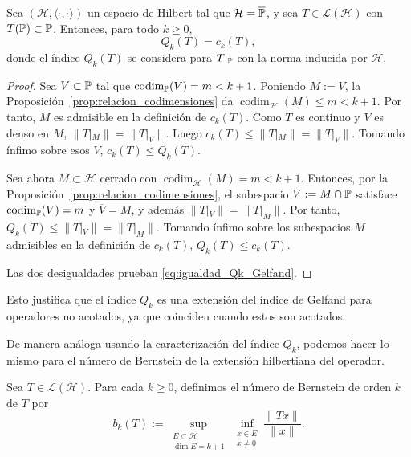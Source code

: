 \begin{thm}\label{thm:equivalencia_Qk_Gelfand}
	Sea $(\mathcal H,\langle\cdot,\cdot\rangle)$ un espacio de Hilbert tal que $\mathcal H=\overline{\mathbb{P}}$, y sea $T\in\mathcal L(\mathcal H)$ con $T(\mathbb{P})\subset\mathbb{P}$. Entonces, para todo $k\ge0$,
	\begin{equation}\label{eq:igualdad_Qk_Gelfand}
		Q_k(T)=c_k(T),
	\end{equation}
	donde el índice $Q_k(T)$ se considera para $T|_{\mathbb{P}}$ con la norma inducida por $\mathcal{H}$.
\end{thm}

\begin{proof}
	Sea $V\subset\mathbb{P}$ tal que \(\operatorname{codim}_{\mathbb{P}}(V)=m<k+1\). Poniendo $M:=\overline V$, la Proposición~\ref{prop:relacion_codimensiones} da \(\operatorname{codim}_{\mathcal H}(M)\le m<k+1\).
	Por tanto, $M$ es admisible en la definición de $c_k(T)$. Como $T$ es continuo y $V$ es denso en $M$,
	\(\|T|_M\|=\|T|_V\|\). Luego \(c_k(T)\le \|T|_M\|=\|T|_V\|\). Tomando ínfimo sobre esos $V$, \(c_k(T)\le Q_k(T)\).

	Sea ahora $M\subset\mathcal H$ cerrado con \(\operatorname{codim}_{\mathcal H}(M)=m<k+1\). Entonces, por la Proposición~\ref{prop:relacion_codimensiones}, el subespacio \(V:=M\cap\mathbb{P}\) satisface \(\operatorname{codim}_{\mathbb{P}}(V)=m\) y \(\overline V=M\), y además \(\|T|_V\|=\|T|_M\|\). Por tanto, \(Q_k(T)\le \|T|_V\|=\|T|_M\|\). Tomando ínfimo sobre los subespacios $M$ admisibles en la definición de $c_k(T)$, \(Q_k(T)\le c_k(T)\).

	Las dos desigualdades prueban \eqref{eq:igualdad_Qk_Gelfand}.
\end{proof}

\begin{rmk}
	Esto justifica que el índice $Q_k$ es una extensión del índice de Gelfand para operadores no acotados, ya que coinciden cuando estos son acotados.
\end{rmk}

De manera análoga usando la caracterización del índice $Q_k$, podemos hacer lo mismo para el número de Bernstein \cite{Ullrich2024} de la extensión hilbertiana del operador.

\begin{defn}\label{def:numeros_bernstein}
	Sea $T\in\mathcal L(\mathcal H)$. Para cada $k\ge0$, definimos el número de Bernstein de orden $k$ de $T$ por
	\[
		b_k(T)
		:=
		\sup_{\substack{E\subset\mathcal H\\ \dim E=k+1}}
		\inf_{\substack{x\in E\\ x\ne0}}
		\frac{\|Tx\|}{\|x\|}.
	\]
\end{defn}

